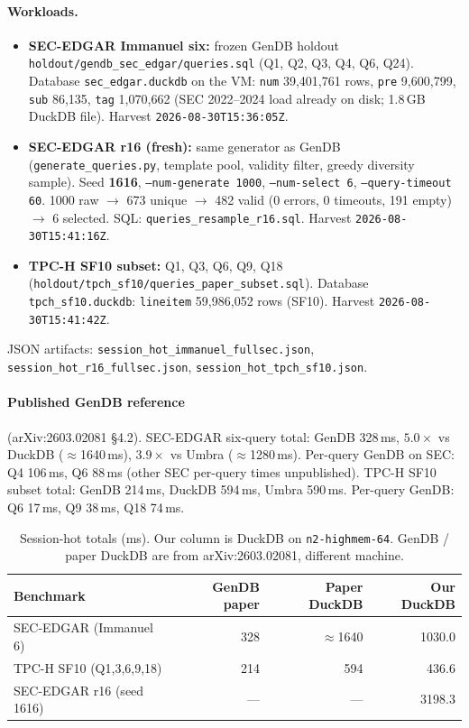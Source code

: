 \paragraph{Workloads.}
\begin{itemize}
  \item \textbf{SEC-EDGAR Immanuel six:} frozen GenDB holdout
        \texttt{holdout/gendb\_sec\_edgar/queries.sql}
        (Q1, Q2, Q3, Q4, Q6, Q24). Database
        \texttt{sec\_edgar.duckdb} on the VM:
        \texttt{num} 39{,}401{,}761 rows, \texttt{pre} 9{,}600{,}799,
        \texttt{sub} 86{,}135, \texttt{tag} 1{,}070{,}662
        (SEC 2022--2024 load already on disk; 1.8\,GB DuckDB file).
        Harvest \texttt{2026-08-30T15:36:05Z}.
  \item \textbf{SEC-EDGAR r16 (fresh):} same generator as GenDB
        (\texttt{generate\_queries.py}, template pool, validity filter,
        greedy diversity sample). Seed \textbf{1616},
        \texttt{--num-generate 1000}, \texttt{--num-select 6},
        \texttt{--query-timeout 60}.
        1000 raw $\rightarrow$ 673 unique $\rightarrow$ 482 valid
        (0 errors, 0 timeouts, 191 empty) $\rightarrow$ 6 selected.
        SQL: \texttt{queries\_resample\_r16.sql}.
        Harvest \texttt{2026-08-30T15:41:16Z}.
  \item \textbf{TPC-H SF10 subset:} Q1, Q3, Q6, Q9, Q18
        (\texttt{holdout/tpch\_sf10/queries\_paper\_subset.sql}).
        Database \texttt{tpch\_sf10.duckdb}: \texttt{lineitem} 59{,}986{,}052 rows
        (SF10). Harvest \texttt{2026-08-30T15:41:42Z}.
\end{itemize}

JSON artifacts:
\texttt{session\_hot\_immanuel\_fullsec.json},
\texttt{session\_hot\_r16\_fullsec.json},
\texttt{session\_hot\_tpch\_sf10.json}.

\paragraph{Published GenDB reference} (arXiv:2603.02081 \S4.2).
SEC-EDGAR six-query total: GenDB 328\,ms, $5.0\times$ vs DuckDB
($\approx$1640\,ms), $3.9\times$ vs Umbra ($\approx$1280\,ms).
Per-query GenDB on SEC: Q4 106\,ms, Q6 88\,ms (other SEC per-query
times unpublished).
TPC-H SF10 subset total: GenDB 214\,ms, DuckDB 594\,ms, Umbra 590\,ms.
Per-query GenDB: Q6 17\,ms, Q9 38\,ms, Q18 74\,ms.

\begin{table}[t]
  \centering
  \small
  \caption{Session-hot totals (ms). Our column is DuckDB on
    \texttt{n2-highmem-64}. GenDB / paper DuckDB are from
    arXiv:2603.02081, different machine.}
  \label{tab:gendb-totals}
  \begin{tabular}{lrrr}
    \toprule
    Benchmark & GenDB paper & Paper DuckDB & Our DuckDB \\
    \midrule
    SEC-EDGAR (Immanuel 6) & 328 & $\approx$1640 & 1030.0 \\
    TPC-H SF10 (Q1,3,6,9,18) & 214 & 594 & 436.6 \\
    SEC-EDGAR r16 (seed 1616) & --- & --- & 3198.3 \\
    \bottomrule
  \end{tabular}
\end{table}

